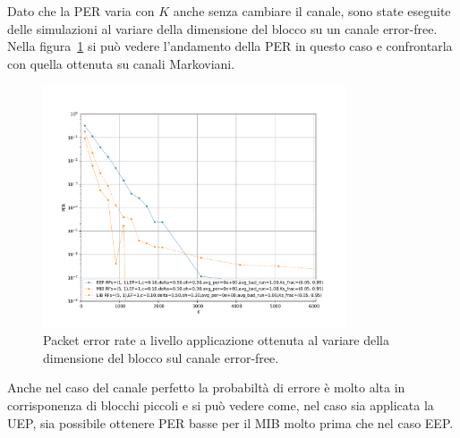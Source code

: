\documentclass[italian, a4paper, 12pt]{article}
\begin{document}
Dato che la PER varia con $K$ anche senza cambiare il canale, sono
state eseguite delle simulazioni al variare della dimensione del
blocco su un canale error-free. Nella figura~\ref{fig:markov_zero} si
può vedere l'andamento della PER in questo caso e confrontarla con
quella ottenuta su canali Markoviani.
%
\begin{figure}[htb]
  \centering
  \includegraphics[width=0.8\textwidth]{plot_markov_zero}
  \caption{Packet error rate a livello applicazione ottenuta al
    variare della dimensione del blocco sul canale error-free.}
  \label{fig:markov_zero}
\end{figure}
%
Anche nel caso del canale perfetto la probabiltà di errore è molto
alta in corrisponenza di blocchi piccoli e si può vedere come, nel
caso sia applicata la UEP, sia possibile ottenere PER basse per il MIB
molto prima che nel caso EEP.
\end{document}
